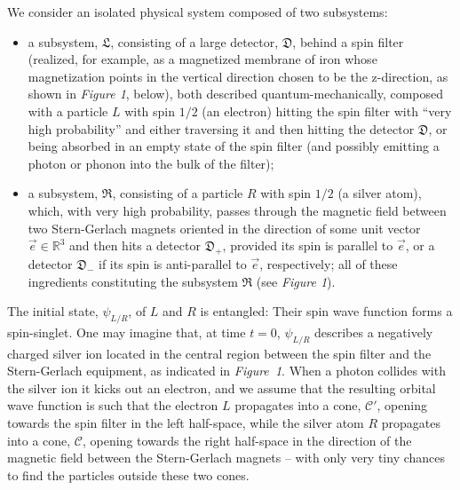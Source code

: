\documentclass[a4paper,11pt]{article}
\begin{document}
We consider an isolated physical system composed of two subsystems: 
\begin{itemize}
\item{a subsystem, $\mathfrak{L}$, consisting of a large detector, $\mathfrak{D}$, behind a spin filter (realized, for example, 
as a magnetized membrane of iron whose magnetization points in the vertical direction 
chosen to be the z-direction, as shown in \textit{Figure 1}, below), both described quantum-mechanically, composed with a 
particle $L$ with spin $1/2$ (an electron) hitting the spin filter with ``very high probability'' and either traversing 
it and then hitting the detector $\mathfrak{D}$, or being absorbed in an empty state of the spin filter 
(and possibly emitting a photon or phonon into the bulk of the filter);}
\item{a subsystem, $\mathfrak{R}$, consisting of a particle $R$ with spin $1/2$ (a silver atom),
which, with very high probability, passes through the magnetic field between two Stern-Gerlach magnets oriented 
in the direction of some unit vector $\vec{e} \in \mathbb{R}^{3}$ and then hits a detector $\mathfrak{D}_{+}$, provided
 its spin is parallel to $\vec{e}$, or a detector $\mathfrak{D}_{-}$ if its spin is anti-parallel to $\vec{e}$, 
 respectively; all of these ingredients constituting the subsystem $\mathfrak{R}$ (see \textit{Figure 1}).}
\end{itemize}
The initial state, $\psi_{L/R}$, of $L$ and $R$ is entangled: Their spin wave function forms 
a spin-singlet. One may imagine that, at time $t=0$, $\psi_{L/R}$ describes a negatively charged silver ion 
located in the central region between the spin filter and the Stern-Gerlach equipment, as indicated in \mbox{\textit{Figure 1}.} 
When a photon collides with the silver ion it kicks out an electron, and we assume that the resulting orbital wave function 
is such that the electron $L$ propagates into a cone, $\mathcal{C}'$, opening towards the spin filter in the left half-space, 
while the silver atom $R$ propagates into a cone, $\mathcal{C}$, opening towards the right half-space in the direction of the 
magnetic field between the Stern-Gerlach magnets -- with only very tiny chances to find the particles outside these 
two cones. 
\end{document}
